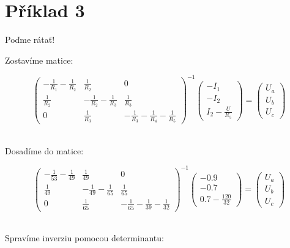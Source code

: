 \section{Příklad 3}
\bigskip
\centerline{\Large{Poďme rátať!}}
\centerline{Zostavíme matice:}
\bigskip
\centering
\[
\begin{pmatrix}

-\frac{1}{R_1} - \frac{1}{R_2} & \frac{1}{R_2} & 0\\
\frac{1}{R_2} & -\frac{1}{R_2} - \frac{1}{R_3} & \frac{1}{R_3}\\
0 & \frac{1}{R_3} & -\frac{1}{R_3} - \frac{1}{R_4} - \frac{1}{R_5}

\end{pmatrix}^{-1}
\begin{pmatrix}
    -I_1\\
    -I_2\\
    I_2 - \frac{U}{R_5}
\end{pmatrix}
=
\begin{pmatrix}
    U_a\\
    U_b\\
    U_c
\end{pmatrix}
\]\\
\bigskip
\centerline{Dosadíme do matice:}
\bigskip
\centering
\[
\begin{pmatrix}

-\frac{1}{53} - \frac{1}{49} & \frac{1}{49} & 0\\
\frac{1}{49} & -\frac{1}{49} - \frac{1}{65} & \frac{1}{65}\\
0 & \frac{1}{65} & -\frac{1}{65} - \frac{1}{39} - \frac{1}{32}

\end{pmatrix}^{-1}
\begin{pmatrix}
    -0.9\\
    -0.7\\
    0.7 - \frac{120}{32}
\end{pmatrix}
=
\begin{pmatrix}
    U_a\\
    U_b\\
    U_c
\end{pmatrix}
\]\\
\bigskip
\centerline{Spravíme inverziu pomocou determinantu:}
\bigskip
\centering
